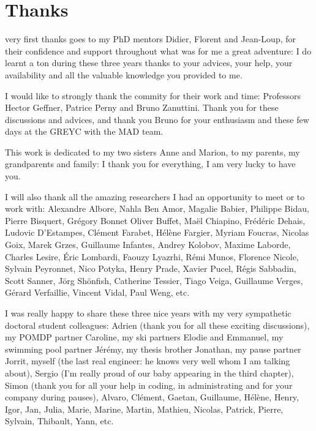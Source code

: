 \chapter*{Thanks}
\vspace{-2cm}
 very first thanks goes to my PhD mentors Didier, Florent and Jean-Loup,
for their confidence and support throughout what was for me a great adventure:
I do learnt a ton during these three years thanks to your advices, your help, 
your availability and all the valuable knowledge you provided to me.

I would like to strongly thank the commity for their work and time: 
Professors Hector Geffner, Patrice Perny and Bruno Zanuttini.
Thank you for these discussions and advices, 
and thank you Bruno for your enthusiasm 
and these few days at the GREYC with the MAD team.

This work is dedicated to my two sisters Anne and Marion, to my parents, my grandparents and family: 
I thank you for everything, I am very lucky to have you.

I will also thank all the amazing researchers 
I had an opportunity to meet or to work with:
Alexandre Albore,
Nahla Ben Amor,
Magalie Babier,
Philippe Bidau, 
Pierre Bisquert,
Gr\'egory Bonnet
Oliver Buffet,
Ma\"el Chiapino,
Fr\'ed\'eric Dehais,
Ludovic D'Estampes,
Cl\'ement Farabet,
H\'el\`ene Fargier,
Myriam Foucras, 
Nicolas Goix,
Marek Grzes, 
Guillaume Infantes,
Andrey Kolobov,
Maxime Laborde,
Charles Lesire,
\'Eric Lombardi,
Faouzy Lyazrhi,
R\'emi Munos,
Florence Nicole,
Sylvain Peyronnet,
Nico Potyka,
Henry Prade,
Xavier Pucel,
R\'egis Sabbadin, 
Scott Sanner,
J\"org Sh\"onfish,
Catherine Tessier,
Tiago Veiga,
Guillaume Verges,
G\'erard Verfaillie,
Vincent Vidal,
Paul Weng, etc.






I was really happy to share these three nice years with
my very sympathetic doctoral student colleagues: 
Adrien (thank you for all these exciting discussions), 
my POMDP partner Caroline,
my ski partners Elodie and Emmanuel,
my swimming pool partner J\'er\'emy, 
my thesis brother Jonathan, 
my pause partner Jorrit, 
myself (the last real engineer: he knows very well whom I am talking about), 
Sergio (I'm really proud of our baby appearing in the third chapter),  
Simon (thank you for all your help in coding, in administrating and for your company during pauses), 
Alvaro, Cl\'ement, Gaetan, Guillaume, H\'el\`ene, Henry, Igor, Jan, Julia, Marie, Marine, Martin, Mathieu, Nicolas, Patrick, Pierre, Sylvain, Thibault, Yann, etc.

